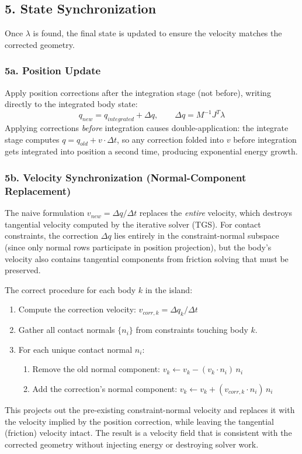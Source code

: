 \subsection*{5. State Synchronization}
Once $\lambda$ is found, the final state is updated to ensure the velocity matches the corrected geometry.

\subsubsection*{5a. Position Update}
Apply position corrections after the integration stage (not before), writing directly to the integrated body state:
$$ q_{new} = q_{integrated} + \Delta q, \qquad \Delta q = M^{-1} J^T \lambda $$
Applying corrections \textit{before} integration causes double-application: the integrate stage computes $q = q_{old} + v \cdot \Delta t$, so any correction folded into $v$ before integration gets integrated into position a second time, producing exponential energy growth.

\subsubsection*{5b. Velocity Synchronization (Normal-Component Replacement)}
The naive formulation $v_{new} = \Delta q / \Delta t$ replaces the \textit{entire} velocity, which destroys tangential velocity computed by the iterative solver (TGS). For contact constraints, the correction $\Delta q$ lies entirely in the constraint-normal subspace (since only normal rows participate in position projection), but the body's velocity also contains tangential components from friction solving that must be preserved.

The correct procedure for each body $k$ in the island:
\begin{enumerate}
    \item Compute the correction velocity: $v_{corr,k} = \Delta q_k / \Delta t$
    \item Gather all contact normals $\{n_i\}$ from constraints touching body $k$.
    \item For each unique contact normal $n_i$:
    \begin{enumerate}
        \item Remove the old normal component: $v_k \leftarrow v_k - (v_k \cdot n_i)\, n_i$
        \item Add the correction's normal component: $v_k \leftarrow v_k + (v_{corr,k} \cdot n_i)\, n_i$
    \end{enumerate}
\end{enumerate}
This projects out the pre-existing constraint-normal velocity and replaces it with the velocity implied by the position correction, while leaving the tangential (friction) velocity intact. The result is a velocity field that is consistent with the corrected geometry without injecting energy or destroying solver work.

